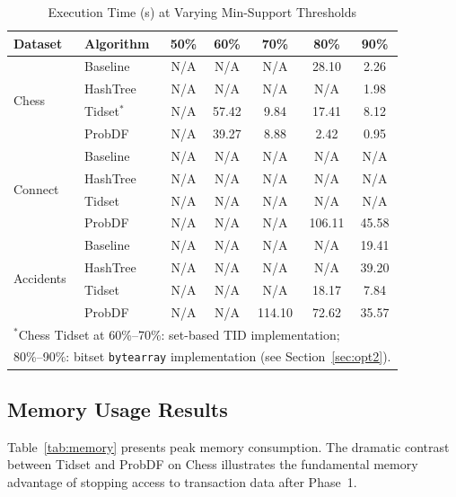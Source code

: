 \documentclass[conference]{IEEEtran}
\begin{document}
\begin{table}[H]
\centering
\caption{Execution Time (s) at Varying Min-Support Thresholds}
\label{tab:time}
\setlength{\tabcolsep}{3pt}
\begin{tabular}{llccccc}
\toprule
\textbf{Dataset} & \textbf{Algorithm} & \textbf{50\%} & \textbf{60\%} & \textbf{70\%} & \textbf{80\%} & \textbf{90\%} \\
\midrule
\multirow{4}{*}{Chess}
  & Baseline  & N/A & N/A   & N/A  & 28.10 & 2.26  \\
  & HashTree  & N/A & N/A   & N/A  & N/A   & 1.98  \\
  & Tidset$^\ast$  & N/A & 57.42 & 9.84 & 17.41 & 8.12  \\
  & ProbDF    & N/A & 39.27 & 8.88 & 2.42  & 0.95  \\
\midrule
\multirow{4}{*}{Connect}
  & Baseline  & N/A & N/A & N/A & N/A    & N/A   \\
  & HashTree  & N/A & N/A & N/A & N/A    & N/A   \\
  & Tidset    & N/A & N/A & N/A & N/A    & N/A   \\
  & ProbDF    & N/A & N/A & N/A & 106.11 & 45.58 \\
\midrule
\multirow{4}{*}{Accidents}
  & Baseline  & N/A & N/A & N/A   & N/A   & 19.41 \\
  & HashTree  & N/A & N/A & N/A   & N/A   & 39.20 \\
  & Tidset    & N/A & N/A & N/A   & 18.17 & 7.84  \\
  & ProbDF    & N/A & N/A & 114.10 & 72.62 & 35.57 \\
\bottomrule
\multicolumn{7}{l}{\footnotesize $^\ast$Chess Tidset at 60\%--70\%: set-based TID implementation;} \\
\multicolumn{7}{l}{\footnotesize 80\%--90\%: bitset \texttt{bytearray} implementation (see Section~\ref{sec:opt2}).}
\end{tabular}
\end{table}

\subsection{Memory Usage Results}

Table~\ref{tab:memory} presents peak memory consumption. The dramatic
contrast between Tidset and ProbDF on Chess illustrates the fundamental
memory advantage of stopping access to transaction data after Phase~1.
\end{document}
